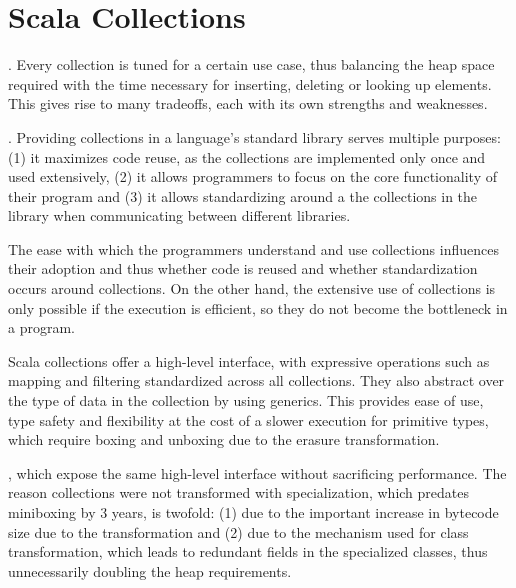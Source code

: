 \section{Scala Collections}



. Every collection is tuned for a certain use case, thus balancing the heap space required with the time necessary for inserting, deleting or looking up elements. This gives rise to many tradeoffs, each with its own strengths and weaknesses.

. Providing collections in a language's standard library serves multiple purposes: (1) it maximizes code reuse, as the collections are implemented only once and used extensively, (2) it allows programmers to focus on the core functionality of their program and (3) it allows standardizing around a the collections in the library when communicating between different libraries.

 The ease with which the programmers understand and use collections influences their adoption and thus whether code is reused and whether standardization occurs around collections. On the other hand, the extensive use of collections is only possible if the execution is efficient, so they do not become the bottleneck in a program.

 Scala collections offer a high-level interface, with expressive operations such as mapping and filtering standardized across all collections. They also abstract over the type of data in the collection by using generics. This provides ease of use, type safety and flexibility at the cost of a slower execution for primitive types, which require boxing and unboxing due to the erasure transformation.

, which expose the same high-level interface without sacrificing performance. The reason collections were not transformed with specialization, which predates miniboxing by 3 years, is twofold: (1) due to the important increase in bytecode size due to the transformation and (2) due to the mechanism used for class transformation, which leads to redundant fields in the specialized classes, thus unnecessarily doubling the heap requirements.

